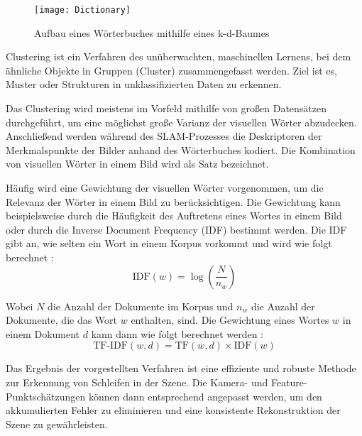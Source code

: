 \begin{figure}
    \centering
    \texttt{[image: Dictionary]}
    \caption{Aufbau eines Wörterbuches mithilfe eines k-d-Baumes\label{fig:Dictionary}}\par
\end{figure}

\begin{tcolorbox}[colback=THAi-Blue!20!white, colframe=THAi-Blue]
    Clustering ist ein Verfahren des unüberwachten, maschinellen Lernens, bei dem ähnliche Objekte in Gruppen (Cluster) zusammengefasst werden. Ziel ist es, Muster oder Strukturen in unklassifizierten Daten zu erkennen. \cite{wikipedia2025clusteranalyse}
\end{tcolorbox}

Das Clustering wird meistens im Vorfeld mithilfe von großen Datensätzen durchgeführt, um eine möglichst große Varianz der visuellen Wörter abzudecken. Anschließend werden während des SLAM-Prozesses die Deskriptoren der Merkmalspunkte der Bilder anhand des Wörterbuches kodiert. Die Kombination von visuellen Wörter in einem Bild wird als Satz bezeichnet. \cite{gao2021vSLAM}

Häufig wird eine Gewichtung der visuellen Wörter vorgenommen, um die Relevanz der Wörter in einem Bild zu berücksichtigen. Die Gewichtung kann beispielsweise durch die Häufigkeit des Auftretens eines Wortes in einem Bild oder durch die Inverse Document Frequency (IDF) bestimmt werden. Die IDF gibt an, wie selten ein Wort in einem Korpus vorkommt und wird wie folgt berechnet \cite{gao2021vSLAM}:
\begin{equation}
    \text{IDF}(w) = \log \left( \frac{N}{n_w} \right)
\end{equation}

Wobei \( N \) die Anzahl der Dokumente im Korpus und \( n_w \) die Anzahl der Dokumente, die das Wort \( w \) enthalten, sind. Die Gewichtung eines Wortes \( w \) in einem Dokument \( d \) kann dann wie folgt berechnet werden \cite{gao2021vSLAM}:
\begin{equation}
    \text{TF-IDF}(w, d) = \text{TF}(w, d) \times \text{IDF}(w)
\end{equation}

Das Ergebnis der vorgestellten Verfahren ist eine effiziente und robuste Methode zur Erkennung von Schleifen in der Szene. Die Kamera- und Feature-Punktschätzungen können dann entsprechend angepasst werden, um den akkumulierten Fehler zu eliminieren und eine konsistente Rekonstruktion der Szene zu gewährleisten. \cite{gao2021vSLAM}

